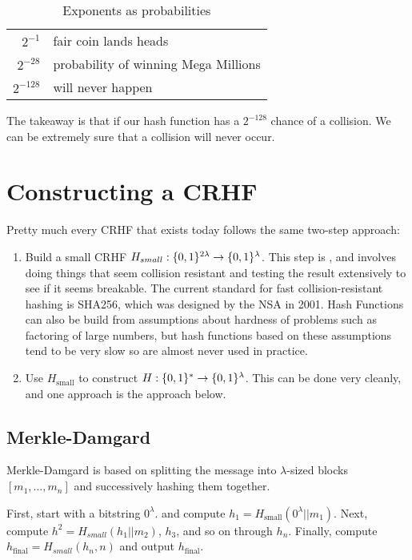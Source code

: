 \begin{table}[htpb]
	\centering
	\caption{Exponents as probabilities}
	\label{tab:exp-probability}

	\begin{tabular}{rl}
		$2^{-1}$ & fair coin lands heads \\
		$2^{-28}$ & probability of winning Mega Millions \\
		$2^{-128}$ & will never happen \\
	\end{tabular}
\end{table}

The takeaway is that if our hash function has a $2^{-128}$ chance of a collision. We can be extremely sure that a collision will never occur.

\section{Constructing a CRHF}
Pretty much every CRHF that exists today follows the same two-step approach:

\begin{enumerate}
	\item Build a small CRHF $H_{small}: \{0,1\}^{2\lambda} \rightarrow \{0,1\}^\lambda$. This step is , and involves doing things that seem collision resistant and testing the result extensively to see if it seems breakable. The current standard for fast collision-resistant hashing is SHA256, which was designed by the NSA in 2001. Hash Functions can also be build from  assumptions about hardness of problems such as factoring of large numbers, but hash functions based on these assumptions tend to be very slow so are almost never used in practice.
	\item Use $H_{\text{small}}$ to construct $H: \{0,1\}^* \rightarrow \{0,1\}^\lambda$. This can be done very cleanly, and one approach is the  approach below.
\end{enumerate}

\subsection{Merkle-Damgard}
Merkle-Damgard is based on splitting the message into $\lambda$-sized blocks $[m_1, \ldots, m_n]$ and successively hashing them together.

First, start with a bitstring $0^\lambda$. and compute $h_1 = H_{\text{small}}(0^\lambda||m_1)$. Next, compute $h^2 = H_{small}(h_1||m_2)$, $h_3$, and so on through $h_n$. Finally, compute $h_{\text{final}} = H_{small}(h_n, n)$ and output $h_{\text{final}}$.


